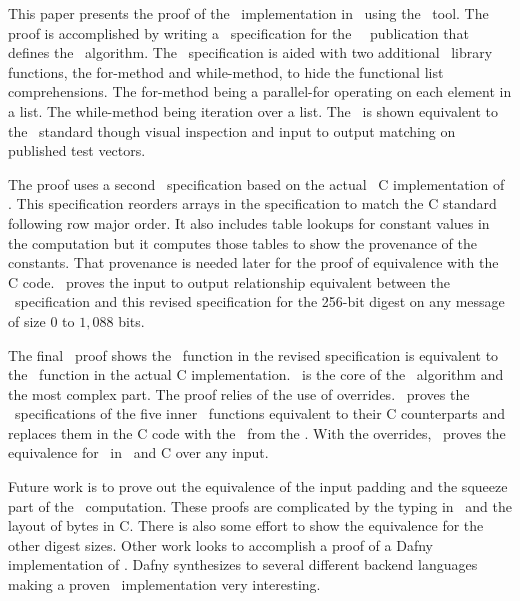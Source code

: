 This paper presents the proof of the \shaThree\ implementation in \openssl\ using the \saw\ tool.
The proof is accomplished by writing a \cryptol\ specification for the \nist\ \fips\ publication that defines the \shaThree\ algorithm.
The \cryptol\ specification is aided with two additional \cryptol\ library functions, the for-method and while-method, to hide the functional list comprehensions.
The for-method being a parallel-for operating on each element in a list.
The while-method being iteration over a list.
The \cryptol\ is shown equivalent to the \fips\ standard though visual inspection and input to output matching on published test vectors.

The proof uses a second \cryptol\ specification based on the actual \openssl\ C implementation of \shaThree.
This specification reorders arrays in the specification to match the C standard following row major order.
It also includes table lookups for constant values in the computation but it computes those tables to show the provenance of the constants.
That provenance is needed later for the proof of equivalence with the C code.
\saw\ proves the input to output relationship equivalent between the \fips\ specification and this revised specification for the 256-bit digest on any message of size $0$ to $1,088$ bits.

The final \saw\ proof shows the \keccak\ function in the revised specification is equivalent to the \keccak\ function in the actual C implementation.
\keccak\ is the core of the \shaThree\ algorithm and the most complex part.
The proof relies of the use of overrides.
\saw\ proves the \cryptol\ specifications of the five inner \keccak\ functions equivalent to their C counterparts and replaces them in the C code with the \sawcore\ from the \cryptol.
With the overrides, \saw\ proves the equivalence for \keccak\ in \cryptol\ and C over any input.

Future work is to prove out the equivalence of the input padding and the squeeze part of the \shaThree\ computation.
These proofs are complicated by the typing in \cryptol\ and the layout of bytes in C.
There is also some effort to show the equivalence for the other digest sizes.
Other work looks to accomplish a proof of a Dafny implementation of \shaThree.
Dafny synthesizes to several different backend languages making a proven \shaThree\ implementation very interesting.
